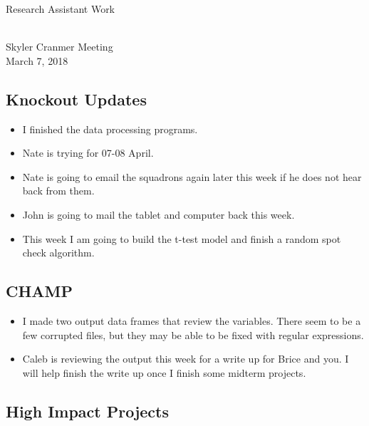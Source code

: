\documentclass[letterpaper,11pt]{article}
\begin{document}
\newcommand{\rauthor}[1]{\noindent \large{\textcolor{deepred}{#1}}}
\newcommand{\rtitle}[1]{\noindent \textcolor{osugrey}{\huge{#1}} }
\thispagestyle{empty}
\vspace{-30pt}
\rtitle{Research Assistant Work}   

\hspace{-1cm}\textcolor{deepred}{\textbf{\Huge{\underline{\phantom{x} \hspace{7in} \phantom{x}}}}} \\

\rauthor{\Large{Skyler Cranmer Meeting}}\\
March 7, 2018\\

 \vspace{0.5cm}

\subsection*{Knockout Updates}
\begin{itemize}
\item I finished the data processing programs. 
\item Nate is trying for 07-08 April. 
\item Nate is going to email the squadrons again later this week if he does not hear back from them.
\item John is going to mail the tablet and computer back this week.  
\item This week I am going to build the t-test model and finish a random spot check algorithm. 
\end{itemize}

\subsection*{CHAMP}
\begin{itemize}
\item I made two output data frames that review the variables. There seem to be a few corrupted files, but they may be able to be fixed with regular expressions. 
\item Caleb is reviewing the output this week for a write up for Brice and you. I will help finish the write up once I finish some midterm projects. 
\end{itemize}

\subsection*{High Impact Projects}
\end{document}
